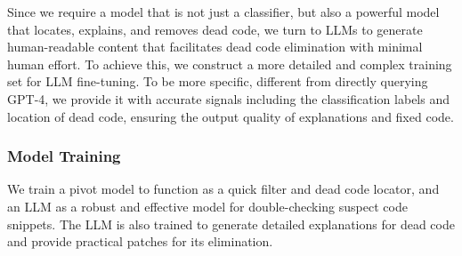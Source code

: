 \documentclass[11pt]{article}
\begin{document}

Since we require a model that is not just a classifier, but also a powerful model that locates, explains, and removes dead code, we turn to LLMs to generate human-readable content that facilitates dead code elimination with minimal human effort. To achieve this, we construct a more detailed and complex training set for LLM fine-tuning.
To be more specific, different from directly querying GPT-4, we provide it with accurate signals including the classification labels and location of dead code, ensuring the output quality of explanations and fixed code.



\subsubsection{Model Training} We train a pivot model to function as a quick filter and dead code locator, and an LLM as a robust and effective model for double-checking suspect code snippets. The LLM is also trained to generate detailed explanations for dead code and provide practical patches for its elimination.
\end{document}
